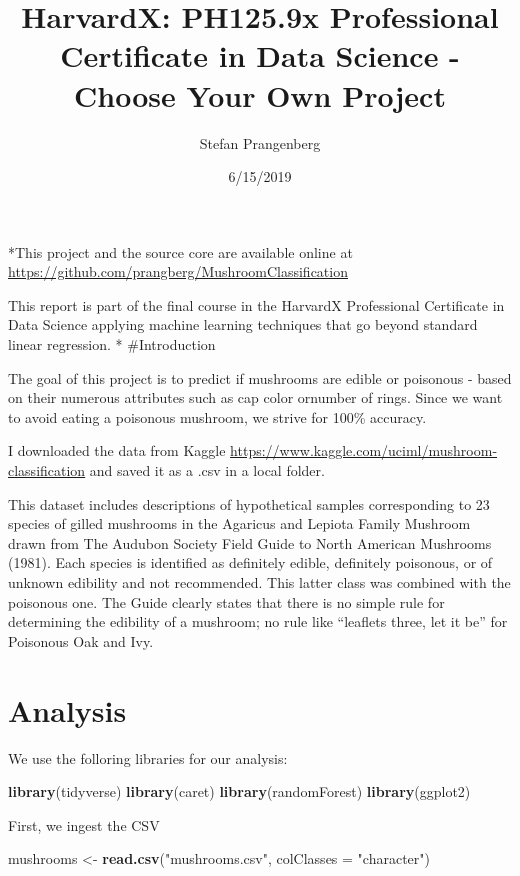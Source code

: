 \documentclass[]{article}
\title{HarvardX: PH125.9x Professional Certificate in Data Science - Choose
Your Own Project}
\author{Stefan Prangenberg}
\date{6/15/2019}
\newenvironment{Shaded}{\begin{snugshade}}{\end{snugshade}}
\newcommand{\KeywordTok}[1]{\textcolor[rgb]{0.13,0.29,0.53}{\textbf{#1}}}
\newcommand{\DataTypeTok}[1]{\textcolor[rgb]{0.13,0.29,0.53}{#1}}
\newcommand{\StringTok}[1]{\textcolor[rgb]{0.31,0.60,0.02}{#1}}
\newcommand{\NormalTok}[1]{#1}
\begin{document}
\maketitle

*This project and the source core are available online at
\url{https://github.com/prangberg/MushroomClassification}

This report is part of the final course in the HarvardX Professional
Certificate in Data Science applying machine learning techniques that go
beyond standard linear regression. * \#Introduction

The goal of this project is to predict if mushrooms are edible or
poisonous - based on their numerous attributes such as cap color
ornumber of rings. Since we want to avoid eating a poisonous mushroom,
we strive for 100\% accuracy.

I downloaded the data from Kaggle
\url{https://www.kaggle.com/uciml/mushroom-classification} and saved it
as a .csv in a local folder.

This dataset includes descriptions of hypothetical samples corresponding
to 23 species of gilled mushrooms in the Agaricus and Lepiota Family
Mushroom drawn from The Audubon Society Field Guide to North American
Mushrooms (1981). Each species is identified as definitely edible,
definitely poisonous, or of unknown edibility and not recommended. This
latter class was combined with the poisonous one. The Guide clearly
states that there is no simple rule for determining the edibility of a
mushroom; no rule like ``leaflets three, let it be'' for Poisonous Oak
and Ivy.

\section{Analysis}\label{analysis}

We use the folloring libraries for our analysis:

\begin{Shaded}
\begin{Highlighting}[]
\KeywordTok{library}\NormalTok{(tidyverse)}
\KeywordTok{library}\NormalTok{(caret)}
\KeywordTok{library}\NormalTok{(randomForest)}
\KeywordTok{library}\NormalTok{(ggplot2)}
\end{Highlighting}
\end{Shaded}

First, we ingest the CSV

\begin{Shaded}
\begin{Highlighting}[]
\NormalTok{mushrooms <-}\StringTok{ }\KeywordTok{read.csv}\NormalTok{(}\StringTok{"mushrooms.csv"}\NormalTok{, }\DataTypeTok{colClasses =} \StringTok{"character"}\NormalTok{) }
\end{Highlighting}
\end{Shaded}
\end{document}
